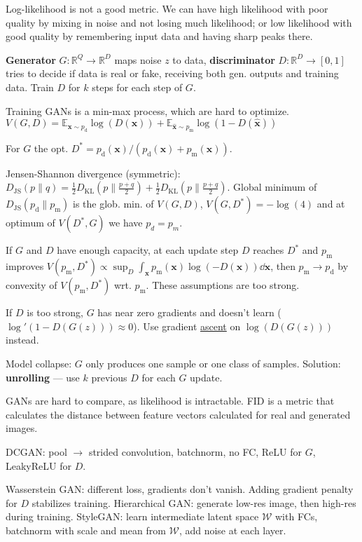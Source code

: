 \documentclass[11pt,landscape,a4paper,fleqn]{article}
\newcommand{\kl}[2]{D_{\mathrm{KL}}(#1\lVert#2)}
\newcommand{\js}[2]{D_{\mathrm{JS}}(#1\lVert#2)}
\newcommand{\E}{\mathbb{E}}
\newcommand{\R}{\mathbb{R}}
\def\myvector#1{\mathbf{#1}}
\def\vx{{\myvector{x}}}
\begin{document}
\begin{multicols*}{4}
Log-likelihood is not a good metric. We can have high likelihood with poor quality by mixing in noise and not losing much likelihood; or low likelihood with good quality by remembering input data and having sharp peaks there.

\textbf{Generator} $G : \R^Q \to \R^D$ maps noise $z$ to data,
\textbf{discriminator} $D : \R^D \to [0, 1]$ tries to decide if data is real or fake,
receiving both gen. outputs and training data.
Train $D$ for $k$ steps for each step of $G$.

Training GANs is a min-max process, which are hard to optimize.
$V(G, D) = \E_{\vx \sim p_{\mathrm{d}}} \log(D(\vx)) + \E_{\hat{\vx} \sim p_{\mathrm{m}}} \log(1 - D(\hat{\vx}))$

For $G$ the opt. $D^* = p_{\mathrm{d}}(\vx) / (p_{\mathrm{d}}(\vx) + p_{\mathrm{m}}(\vx))$.

Jensen-Shannon divergence (symmetric):
$\js{p}{q} = \frac{1}{2} \kl{p}{\frac{p + q}{2}} + \frac{1}{2} \kl{p}{\frac{p + q}{2}}$.
Global minimum of $\js{p_{\mathrm{d}}}{p_{\mathrm{m}}}$ is the glob. min. of $V(G, D)$,
$V(G, D^*) = - \log(4)$ and at optimum of $V(D^*, G)$ we have $p_d = p_m$.

If $G$ and $D$ have enough capacity, at each update step $D$ reaches $D^*$
and $p_{\mathrm{m}}$ improves $V(p_{\mathrm{m}}, D^*) \propto \sup_D \int_{\vx} p_{\mathrm{m}}(\vx) \log( - D(\vx)) \dd \vx$,
then $p_{\mathrm{m}} \to p_{\mathrm{d}}$ by convexity of $V(p_{\mathrm{m}}, D^*)$ wrt. $p_{\mathrm{m}}$.
These assumptions are too strong.

If $D$ is too strong, $G$ has near zero gradients and doesn't learn ($\log'(1 - D(G(z))) \approx 0$).
Use gradient \underline{ascent} on $\log(D(G(z)))$ instead.

Model collapse: $G$ only produces one sample or one class of samples.
Solution: \textbf{unrolling} --- use $k$ previous $D$ for each $G$ update.

GANs are hard to compare, as likelihood is intractable.
FID is a metric that calculates the distance between feature vectors
calculated for real and generated images.

DCGAN: pool $\to$ strided convolution, batchnorm, no FC, ReLU for $G$, LeakyReLU for $D$.

Wasserstein GAN: different loss, gradients don't vanish.
Adding gradient penalty for $D$ stabilizes training.
Hierarchical GAN: generate low-res image, then high-res during training.
StyleGAN: learn intermediate latent space $\mathcal{W}$ with FCs,
batchnorm with scale and mean from $\mathcal{W}$, add noise at each layer.


\end{multicols*}
\end{document}
